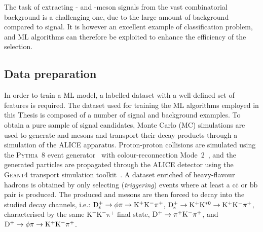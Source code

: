 The task of extracting \ds- and \dpl-meson signals from the vast combinatorial background is a challenging one, due to the large amount of background compared to signal. It is however an excellent example of classification problem, and ML algorithms can therefore be exploited to enhance the efficiency of the selection. 

\subsection{Data preparation}\label{sec:ml_data_preparation}
In order to train a ML model, a labelled dataset with a well-defined set of features is required. The dataset used for training the ML algorithms employed in this Thesis is composed of a number of signal and background examples. To obtain a pure sample of signal candidates, Monte Carlo (MC) simulations are used to generate \ds and \dpl mesons and transport their decay products through a simulation of the ALICE apparatus. Proton-proton collisions are simulated using the \textsc{Pythia~8} event generator~\cite{Bierlich:2022pfr} with colour-reconnection Mode~2~\cite{Christiansen:2015yqa}, and the generated particles are propagated through the ALICE detector using the \textsc{Geant4} transport simulation toolkit~\cite{GEANT4:2002zbu}. A dataset enriched of heavy-flavour hadrons is obtained by only selecting (\emph{triggering}) events where at least a $\mathrm{c\overline{c}}$ or $\mathrm{b\overline{b}}$ pair is produced. The produced \ds and \dpl mesons are then forced to decay into the studied decay channels, i.e.: \mbox{$\mathrm{D_s^+} \rightarrow \phi \pi \rightarrow \mathrm{K^+K^-\pi^+}$}, $\mathrm{D_s^+} \rightarrow \mathrm{K^+K^{*0}}\rightarrow \mathrm{K^+K^-\pi^+}$, characterised by the same $\mathrm{K^+K^-\pi^+}$ final state, $\mathrm{D^+} \rightarrow \mathrm{\pi^+K^-\pi^+}$, and $\mathrm{D^+} \rightarrow \phi \pi \rightarrow \mathrm{K^+K^-\pi^+}$. 


